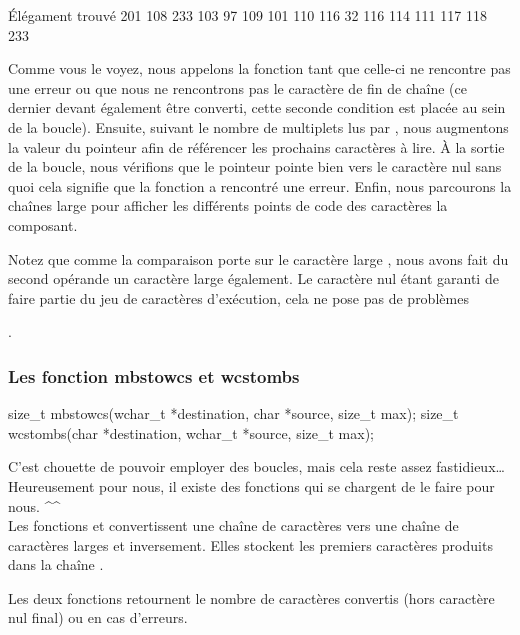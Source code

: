 \begin{C}
Élégament trouvé                   
201 108 233 103 97 109 101 110 116 32 116 114 111 117 118 233 
\end{C}

Comme vous le voyez, nous appelons la fonction  tant
que celle-ci ne rencontre pas une erreur ou que nous ne rencontrons pas
le caractère de fin de chaîne (ce dernier devant également être
converti, cette seconde condition est placée au sein de la boucle).
Ensuite, suivant le nombre de multiplets lus par , nous
augmentons la valeur du pointeur  afin de référencer les
prochains caractères à lire. À la sortie de la boucle, nous vérifions
que le pointeur  pointe bien vers le caractère nul sans quoi
cela signifie que la fonction  a rencontré une erreur.
Enfin, nous parcourons la chaînes large  pour afficher les
différents points de code des caractères la composant.

\begin{infobox}
  Notez que comme la comparaison
porte sur le caractère large , nous avons fait du
second opérande un caractère large également. Le caractère nul étant
garanti de faire partie du jeu de caractères d'exécution, cela ne pose
pas de problèmes
\end{infobox}
.

\subsubsection{Les fonction mbstowcs et wcstombs}
\label{les-fonction-mbstowcs-et-wcstombs}

\begin{C}
size_t mbstowcs(wchar_t *destination, char *source, size_t max);
size_t wcstombs(char *destination, wchar_t *source, size_t max);
\end{C}

C'est chouette de pouvoir employer des boucles, mais cela reste assez
fastidieux\ldots{} Heureusement pour nous, il existe des fonctions qui
se chargent de le faire pour nous. \^{}\^{}\\
Les fonctions  et  convertissent
une chaîne de caractères vers une chaîne de caractères larges et
inversement. Elles stockent les  premiers caractères
produits dans la chaîne .

Les deux fonctions retournent le nombre de caractères convertis (hors
caractère nul final) ou  en cas d'erreurs.

